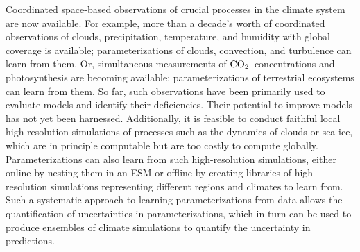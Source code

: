 \documentclass[draft]{agujournal}
\newcommand{\coo}{${\rm {CO}_{2}}$}
\begin{document}
Coordinated space-based observations of crucial processes in the climate system are now available. For example, more than a decade's worth of coordinated observations of clouds, precipitation, temperature, and humidity with global coverage is available; parameterizations of clouds, convection, and turbulence can learn from them. Or, simultaneous measurements of \coo\ concentrations and photosynthesis are becoming available; parameterizations of terrestrial ecosystems can learn from them. So far, such observations have been primarily used to evaluate models and identify their deficiencies. Their potential to improve models has not yet been harnessed. Additionally, it is feasible to conduct faithful local high-resolution simulations of processes such as the dynamics of clouds or sea ice, which are in principle computable but are too costly to compute globally. Parameterizations can also learn from such high-resolution simulations, either online by nesting them in an ESM or offline by creating libraries of high-resolution simulations representing different regions and climates to learn from. Such a systematic approach to learning parameterizations from data allows the quantification of uncertainties in parameterizations, which in turn can be used to produce ensembles of climate simulations to quantify the uncertainty in predictions.
\end{document}
